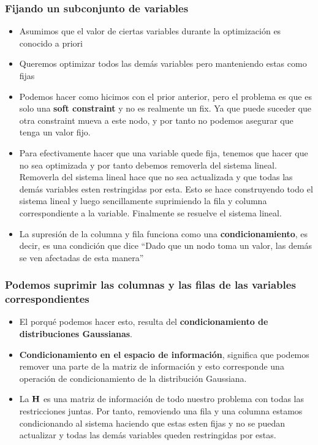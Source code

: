 \begin{frame}
    \frametitle{Fijando un subconjunto de variables}
    
    \begin{itemize}
        \item Asumimos que el valor de ciertas variables durante la optimización es conocido a priori
        \item Queremos optimizar todos las demás variables pero manteniendo estas como fijas
        \item Podemos hacer como hicimos con el prior anterior, pero el problema es que es solo una {\bf soft constraint} y no es realmente un fix. Ya que puede suceder que otra constraint mueva a este nodo, y por tanto no podemos asegurar que tenga un valor fijo.
        \item Para efectivamente hacer que una variable quede fija, tenemos que hacer que no sea optimizada y por tanto debemos removerla del sistema lineal. Removerla del sistema lineal hace que no sea actualizada y que todas las demás variables esten restringidas por esta. Esto se hace construyendo todo el sistema lineal y luego sencillamente suprimiendo la fila y columna correspondiente a la variable. Finalmente se resuelve el sistema lineal.
        \item La supresión de la columna y fila funciona como una {\bf condicionamiento}, es decir, es una condición que dice ``Dado que un nodo toma un valor, las demás se ven afectadas de esta manera''
        
    \end{itemize}
    
\end{frame}

\begin{frame}
    \frametitle{Podemos suprimir las columnas y las filas de las variables correspondientes}
    
    \begin{itemize}
        \item El porqué podemos hacer esto, resulta del {\bf condicionamiento de distribuciones Gaussianas}.
        \item {\bf Condicionamiento en el espacio de información}, significa que podemos remover una parte de la matriz de información y esto corresponde una operación de condicionamiento de la distribución Gaussiana.
        \item La $\boldsymbol{\mathbf{H}}$ es una matriz de información de todo nuestro problema con todas las restricciones juntas. Por tanto, removiendo una fila y una columna estamos condicionando al sistema haciendo que estas esten fijas y no se puedan actualizar y todas las demás variables queden restringidas por estas.
    \end{itemize}
   
    
\end{frame}


